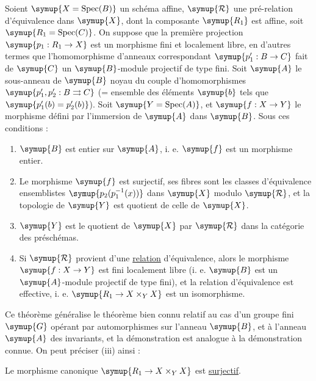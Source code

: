  Soient $\symup{X=\operatorname{Spec}(B)}$ un schéma affine,
$\symup{\mathcal R}$ une pré-relation d'équivalence dans $\symup{X}$, dont la composante $\symup{R_1}$ est
affine, soit $\symup{R_1=\operatorname{Spec}(C)}$. On suppose que la première
projection $\symup{p_1:R_1\to X}$ est un morphisme fini et localement libre, en
d'autres termes que l'homomorphisme d'anneaux correspondant
$\symup{p_1':B\to C}$ fait de $\symup{C}$ un $\symup{B}$-module projectif de type fini. Soit $\symup{A}$ le
sous-anneau de $\symup{B}$ noyau du couple d'homomorphismes $\symup{p_1',p_2':B\rightrightarrows C}$ (= ensemble des éléments $\symup{b}$ tels que $\symup{p_1'(b)=p_2'(b)}$). Soit
$\symup{Y=\operatorname{Spec}(A)}$, et $\symup{f:X\to Y}$ le morphisme défini par l'immersion
de $\symup{A}$ dans $\symup{B}$. Sous ces conditions :
\begin{enumerate}
\item[(i)] $\symup{B}$ est entier sur $\symup{A}$, i. e. $\symup{f}$ est un morphisme entier.

\item[(ii)] Le morphisme $\symup{f}$ est surjectif, ses fibres sont les classes
d'équivalence
ensemblistes $\symup{p_2\allowbreak(p_1^{-1}(x))}$ dans $\symup{X}$ modulo $\symup{\mathcal R}$, et la topologie de $\symup{Y}$
est quotient de celle de $\symup{X}$.

\item[(iii)] $\symup{Y}$ est le quotient de $\symup{X}$ par $\symup{\mathcal R}$ dans la catégorie des
préschémas.

\item[(iv)] Si $\symup{\mathcal R}$ provient d'une \uline{relation} d'équivalence, alors le
morphisme $\symup{f:X\to Y}$ est fini localement libre (i. e. $\symup{B}$ est un $\symup{A}$-module
projectif de type fini), et la relation d'équivalence est effective, i. e.
$\symup{R_1\to X\times_Y X}$ est un isomorphisme.
\end{enumerate}

Ce théorème généralise le théorème bien connu relatif au cas d'un groupe
fini $\symup{G}$ opérant par automorphismes sur l'anneau $\symup{B}$, et à l'anneau $\symup{A}$ des
invariants, et la démonstration est analogue à la démonstration connue. On
peut préciser (iii) ainsi :

 Le morphisme canonique
$\symup{R_1\to X\times_Y X}$ est \uline{surjectif}.

